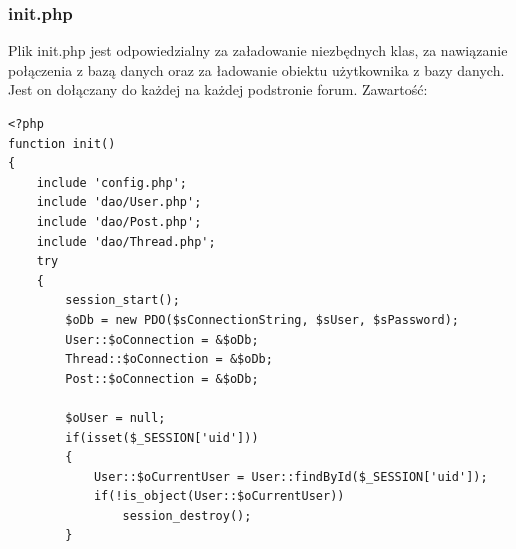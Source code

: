 \documentclass[a4paper,10pt]{article}
\begin{document}
{\subsubsection{init.php}
Plik init.php jest odpowiedzialny za załadowanie niezbędnych klas, za nawiązanie połączenia z bazą danych oraz za ładowanie obiektu użytkownika z bazy danych. Jest on dołączany do każdej na każdej podstronie forum. Zawartość: \\
\begin{verbatim}
<?php
function init()
{
	include 'config.php';
	include 'dao/User.php';
	include 'dao/Post.php';
	include 'dao/Thread.php';
	try
	{
		session_start();
		$oDb = new PDO($sConnectionString, $sUser, $sPassword);
		User::$oConnection = &$oDb;
		Thread::$oConnection = &$oDb;
		Post::$oConnection = &$oDb;
		
		$oUser = null;
		if(isset($_SESSION['uid']))
		{
			User::$oCurrentUser = User::findById($_SESSION['uid']);
			if(!is_object(User::$oCurrentUser))
				session_destroy();
		}
			

\end{verbatim}}
\end{document}
